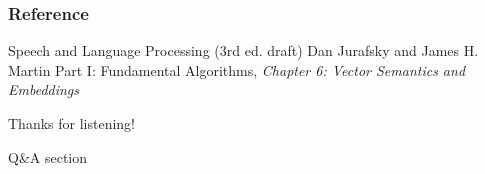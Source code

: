 \documentclass[13.5pt,aspecratio=169, xcolor=dvipsnames]{beamer}
\begin{document}
            
        
    



\onehalfspacing
\begin{frame} %
	\frametitle{Reference}
	
	\begin{thebibliography}{99} %
		\footnotesize %
		
			Speech and Language Processing (3rd ed. draft)
			\newblock Dan Jurafsky and James H. Martin
			\newblock Part I: Fundamental Algorithms, \emph{Chapter 6: Vector Semantics and
            Embeddings}


	\end{thebibliography}
\end{frame}




\begin{frame} %
	\begin{center}
		{\Huge Thanks for listening!}
		
		\bigskip\bigskip %
		
		{\LARGE Q\&A section}
	\end{center}
\end{frame}
\end{document}
